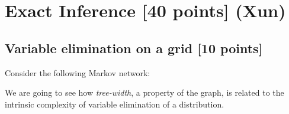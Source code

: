 \documentclass[12pt]{article} \usepackage[utf8]{inputenc}
\begin{document}
\newpage

\section{Exact Inference [40 points] (Xun)}

\subsection{Variable elimination on a grid [10 points]}

Consider the following Markov network:

\begin{figure}[h]
\centering
{}
\end{figure}


We are going to see how \emph{tree-width}, a property of the graph, is related to the intrinsic complexity of variable elimination of a distribution. 
\end{document}
